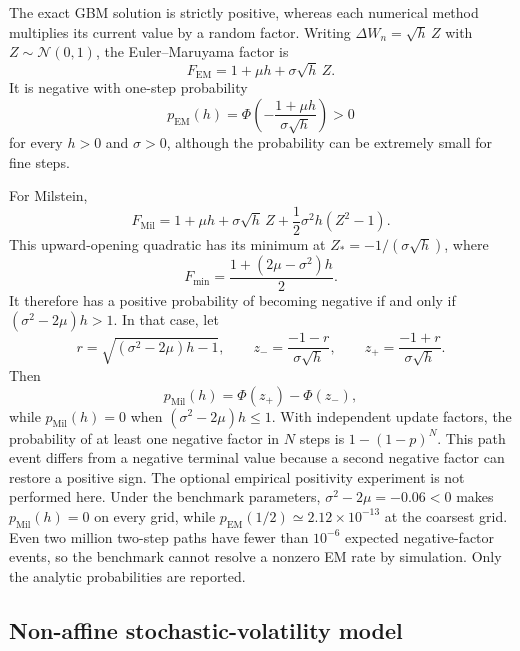 The exact GBM solution is strictly positive, whereas each numerical method
multiplies its current value by a random factor.  Writing
$\Delta W_n=\sqrt h\,Z$ with $Z\sim\mathcal{N}(0,1)$, the Euler--Maruyama factor
is
\[
    F_{\mathrm{EM}}=1+\mu h+\sigma\sqrt h\,Z.
\]
It is negative with one-step probability
\begin{equation}
    p_{\mathrm{EM}}(h)
      =\Phi\!\left(-\frac{1+\mu h}{\sigma\sqrt h}\right)>0
    \label{eq:em-negativity}
\end{equation}
for every $h>0$ and $\sigma>0$, although the probability can be extremely
small for fine steps.

For Milstein,
\[
    F_{\mathrm{Mil}}
      =1+\mu h+\sigma\sqrt h\,Z
        +\frac12\sigma^2h(Z^2-1).
\]
This upward-opening quadratic has its minimum at
$Z_*=-1/(\sigma\sqrt h)$, where
\[
    F_{\min}=\frac{1+(2\mu-\sigma^2)h}{2}.
\]
It therefore has a positive probability of becoming negative if and only if
$(\sigma^2-2\mu)h>1$.  In that case, let
\[
    r=\sqrt{(\sigma^2-2\mu)h-1},
    \qquad
    z_- =\frac{-1-r}{\sigma\sqrt h},
    \qquad
    z_+ =\frac{-1+r}{\sigma\sqrt h}.
\]
Then
\begin{equation}
    p_{\mathrm{Mil}}(h)=\Phi(z_+)-\Phi(z_-),
    \label{eq:milstein-negativity}
\end{equation}
while $p_{\mathrm{Mil}}(h)=0$ when
$(\sigma^2-2\mu)h\leq1$.  With independent update factors, the probability of
at least one negative factor in $N$ steps is $1-(1-p)^N$.  This path event
differs from a negative terminal value because a second negative factor can
restore a positive sign.  The optional empirical positivity experiment is
not performed here.  Under the benchmark parameters,
$\sigma^2-2\mu=-0.06<0$ makes $p_{\mathrm{Mil}}(h)=0$ on every grid, while
$p_{\mathrm{EM}}(1/2)\simeq2.12\times10^{-13}$ at the coarsest grid.  Even
two million two-step paths have fewer than $10^{-6}$ expected negative-factor
events, so the benchmark cannot resolve a nonzero EM rate by simulation.
Only the analytic probabilities are reported.

\subsection{Non-affine stochastic-volatility model}
\label{subsec:nonaffine-theory}


